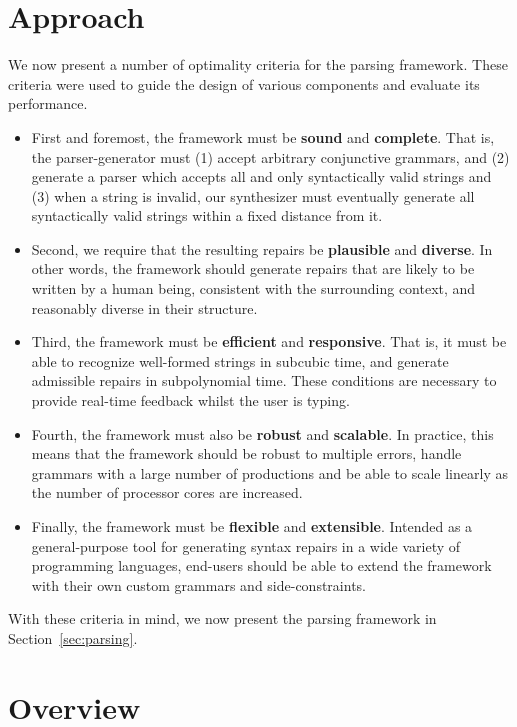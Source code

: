 \documentclass[sigplan,review,anonymous,acmsmall]{acmart}\settopmatter{printfolios=false,printccs=false,printacmref=false}
\begin{document}
\section{Approach}

We now present a number of optimality criteria for the parsing framework. These criteria were used to guide the design of various components and evaluate its performance.

\begin{itemize}
  \item First and foremost, the framework must be \textbf{sound} and \textbf{complete}. That is, the parser-generator must (1) accept arbitrary conjunctive grammars, and (2) generate a parser which accepts all and only syntactically valid strings and (3) when a string is invalid, our synthesizer must eventually generate all syntactically valid strings within a fixed distance from it.
  \item Second, we require that the resulting repairs be \textbf{plausible} and \textbf{diverse}. In other words, the framework should generate repairs that are likely to be written by a human being, consistent with the surrounding context, and reasonably diverse in their structure.
  \item Third, the framework must be \textbf{efficient} and \textbf{responsive}. That is, it must be able to recognize well-formed strings in subcubic time, and generate admissible repairs in subpolynomial time. These conditions are necessary to provide real-time feedback whilst the user is typing.
  \item Fourth, the framework must also be \textbf{robust} and \textbf{scalable}. In practice, this means that the framework should be robust to multiple errors, handle grammars with a large number of productions and be able to scale linearly as the number of processor cores are increased.
  \item Finally, the framework must be \textbf{flexible} and \textbf{extensible}. Intended as a general-purpose tool for generating syntax repairs in a wide variety of programming languages, end-users should be able to extend the framework with their own custom grammars and side-constraints.
\end{itemize}

With these criteria in mind, we now present the parsing framework in Section~\ref{sec:parsing}.

\section{Overview}
\end{document}
